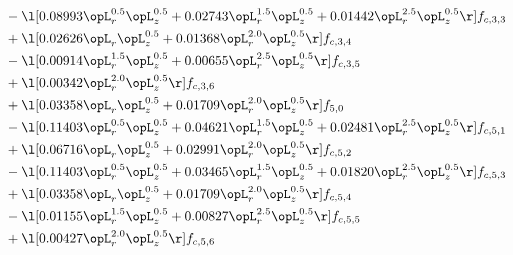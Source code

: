 \begin{alignat}{2}
& - \l[  0.08993 \opL_r^{0.5} \opL_z^{0.5} +  0.02743 \opL_r^{1.5} \opL_z^{0.5} +  0.01442 \opL_r^{2.5} \opL_z^{0.5}  \r] f_{c,3,3} \nonumber \\ 
& + \l[  0.02626 \opL_r \opL_z^{0.5} +  0.01368 \opL_r^{2.0} \opL_z^{0.5}  \r] f_{c,3,4} \nonumber \\ 
& - \l[  0.00914 \opL_r^{1.5} \opL_z^{0.5} +  0.00655 \opL_r^{2.5} \opL_z^{0.5}  \r] f_{c,3,5} \nonumber \\ 
& + \l[  0.00342 \opL_r^{2.0} \opL_z^{0.5}  \r] f_{c,3,6} \nonumber \\ 
& + \l[  0.03358 \opL_r \opL_z^{0.5} +  0.01709 \opL_r^{2.0} \opL_z^{0.5}  \r] f_{5,0} \nonumber \\ 
& - \l[  0.11403 \opL_r^{0.5} \opL_z^{0.5} +  0.04621 \opL_r^{1.5} \opL_z^{0.5} +  0.02481 \opL_r^{2.5} \opL_z^{0.5}  \r] f_{c,5,1} \nonumber \\ 
& + \l[  0.06716 \opL_r \opL_z^{0.5} +  0.02991 \opL_r^{2.0} \opL_z^{0.5}  \r] f_{c,5,2} \nonumber \\ 
& - \l[  0.11403 \opL_r^{0.5} \opL_z^{0.5} +  0.03465 \opL_r^{1.5} \opL_z^{0.5} +  0.01820 \opL_r^{2.5} \opL_z^{0.5}  \r] f_{c,5,3} \nonumber \\ 
& + \l[  0.03358 \opL_r \opL_z^{0.5} +  0.01709 \opL_r^{2.0} \opL_z^{0.5}  \r] f_{c,5,4} \nonumber \\ 
& - \l[  0.01155 \opL_r^{1.5} \opL_z^{0.5} +  0.00827 \opL_r^{2.5} \opL_z^{0.5}  \r] f_{c,5,5} \nonumber \\ 
& + \l[  0.00427 \opL_r^{2.0} \opL_z^{0.5}  \r] f_{c,5,6} \nonumber \\ 
\end{alignat} 


